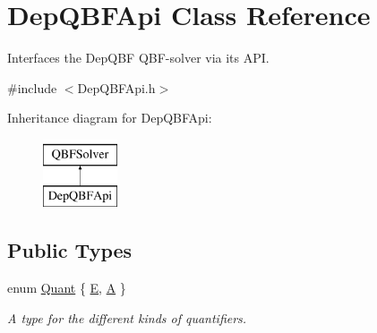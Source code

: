 \hypertarget{classDepQBFApi}{\section{Dep\-Q\-B\-F\-Api Class Reference}
\label{classDepQBFApi}
}


Interfaces the Dep\-Q\-B\-F Q\-B\-F-\/solver via its A\-P\-I.  




{\ttfamily \#include $<$Dep\-Q\-B\-F\-Api.\-h$>$}

Inheritance diagram for Dep\-Q\-B\-F\-Api\-:\begin{figure}[H]
\begin{center}
\leavevmode
\includegraphics[height=2.000000cm]{classDepQBFApi}
\end{center}
\end{figure}
\subsection*{Public Types}
\begin{DoxyCompactItemize}
\item 
enum \hyperlink{classQBFSolver_ac091e263cb55286cc07b2451bcf4d3c7}{Quant} \{ \hyperlink{classQBFSolver_ac091e263cb55286cc07b2451bcf4d3c7a090ab4a5b262710ccd80e97d72f9a7b3}{E}, 
\hyperlink{classQBFSolver_ac091e263cb55286cc07b2451bcf4d3c7afd6518d5d985aa8346ac071e4c0d8ee0}{A}
 \}
\begin{DoxyCompactList}\small\item\em A type for the different kinds of quantifiers. \end{DoxyCompactList}\end{DoxyCompactItemize}
